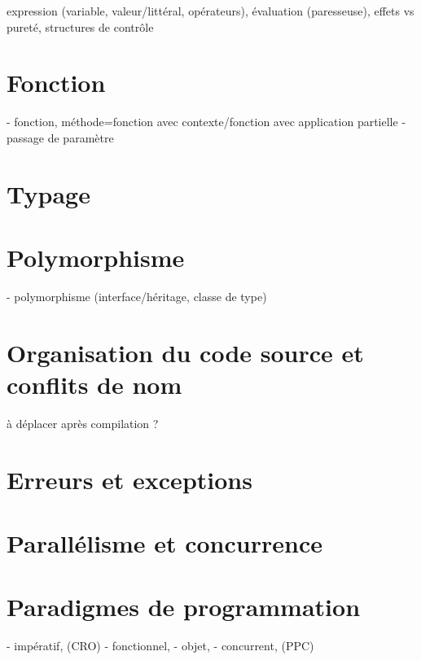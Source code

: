 \documentclass[a4paper,francais]{insalyon}
\begin{document}
expression (variable, valeur/littéral, opérateurs), évaluation (paresseuse), effets vs pureté, structures de contrôle

\section{Fonction}

- fonction, méthode=fonction avec contexte/fonction avec application partielle
- passage de paramètre

\section{Typage}

\section{Polymorphisme}

- polymorphisme (interface/héritage, classe de type)

\section{Organisation du code source et conflits de nom}

à déplacer après compilation ?

\section{Erreurs et exceptions}

\section{Parallélisme et concurrence}

\section{Paradigmes de programmation}

- impératif, (CRO)
- fonctionnel, 
- objet, 
- concurrent, (PPC)



\end{document}
